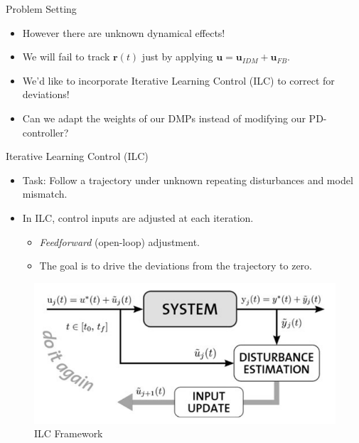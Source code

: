 \documentclass{beamer}
\newcommand{\traj}{\mathbf{r}} %
\newcommand{\sysInput}{\mathbf{u}} %
\begin{document}
%
\begin{frame}{Problem Setting}
\begin{itemize}	
\item However there are unknown dynamical effects! \pause
\item We will fail to track $\traj(t)$ just by applying $\sysInput = \sysInput_{IDM} + \sysInput_{FB}$. \pause
\item We'd like to incorporate Iterative Learning Control (ILC) to correct for deviations! \pause
\item Can we adapt the weights of our DMPs instead of modifying our PD-controller?
\end{itemize}
\end{frame}
%
\begin{frame}{Iterative Learning Control (ILC)}
\begin{itemize}
\item Task: Follow a trajectory under unknown repeating disturbances and model mismatch. \cite{Survey} \pause
\item In ILC, control inputs are adjusted at each iteration. \pause
	\begin{itemize}
	\item \emph{Feedforward} (open-loop) adjustment. \pause
	\item The goal is to drive the deviations from the trajectory to zero. \pause
	\end{itemize}
\end{itemize}
\begin{figure}
\center
\includegraphics[scale=0.25]{ilc_framework}			
\caption{ILC Framework \cite{ILC_Angela}}
\end{figure}
\end{frame}
%
\end{document}
